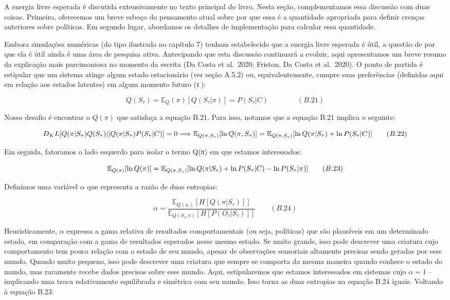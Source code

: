 \documentclass[
  12pt,
]{book}
\begin{document}
A energia livre esperada é discutida extensivamente no texto principal do livro. Nesta seção, complementamos essa discussão com duas coisas. Primeiro, oferecemos um breve esboço do pensamento atual sobre por que essa é a quantidade apropriada para definir crenças anteriores sobre políticas. Em segundo lugar, abordamos os detalhes de implementação para calcular essa quantidade.

Embora simulações numéricas (do tipo ilustrado no capítulo 7) tenham estabelecido que a energia livre esperada é útil, a questão de por que ela é útil ainda é uma área de pesquisa ativa. Antecipando que esta discussão continuará a evoluir, aqui apresentamos um breve resumo da explicação mais parcimoniosa no momento da escrita (Da Costa et al.~2020; Friston, Da Costa et al.~2020). O ponto de partida é estipular que um sistema atinge algum estado estacionário (ver seção A.5.2) ou, equivalentemente, cumpre suas preferências (definidas aqui em relação aos estados latentes) em algum momento futuro (τ ):

\[ Q(S_\tau)=\mathbb E_Q(\pi)[Q(S_\tau|\pi)]=P(S_\tau|C) \qquad\qquad (B.21) \]

Nosso desafio é encontrar o \(Q(\pi)\) que satisfaça a equação B.21. Para isso, notamos que a equação B.21 implica o seguinte:

\[D_KL[Q(\pi|S_\tau)Q(S_\tau) || Q(\pi|S_\tau)P(S_\tau|C)]=0 \\ 
\Longrightarrow 
\\ \mathbb E_{Q(\pi,S_\tau)}[\ln Q(\pi,S_\tau)] = \mathbb E_{Q(\pi,S_\tau)}[\ln Q(\pi|S_\tau) + \ln P(S_\tau|C)] \qquad (B.22)\]

Em seguida, fatoramos o lado esquerdo para isolar o termo Q(π) em que estamos interessados:

\[\\ \mathbb E_{Q(\pi)}[\ln Q(\pi)] = \mathbb E_{Q(\pi,S_\tau)}[\ln Q(\pi|S_\tau) + \ln P(S_\tau|C) - \ln P(S_\tau|\pi)] \qquad (B.23)\]

Definimos uma variável \(\alpha\) que representa a razão de duas entropias:

\[ \alpha = \frac{\mathbb E_{Q(s_\tau)}[H[Q(\pi| S_\tau)]]}{\mathbb E_{Q(S_\tau,\pi)}[H[P(O_\tau| S_\tau)]]} \qquad (B.24)\]

Heuristicamente, \(\alpha\) expressa a gama relativa de resultados comportamentais (ou seja, políticas) que são plausíveis em um determinado estado, em comparação com a gama de resultados esperados nesse mesmo estado. Se muito grande, isso pode descrever uma criatura cujo comportamento tem pouca relação com o estado de seu mundo, apesar de observações sensoriais altamente precisas sendo geradas por esse mundo. Quando muito pequeno, isso pode descrever uma criatura que sempre se comporta da mesma maneira quando conhece o estado do mundo, mas raramente recebe dados precisos sobre esse mundo. Aqui, estipularemos que estamos interessados \hspace{0pt}\hspace{0pt}em sistemas cujo \(α = 1\) -- implicando uma troca relativamente equilibrada e simétrica com seu mundo. Isso torna as duas entropias na equação B.24 iguais. Voltando à equação B.23:
\end{document}
